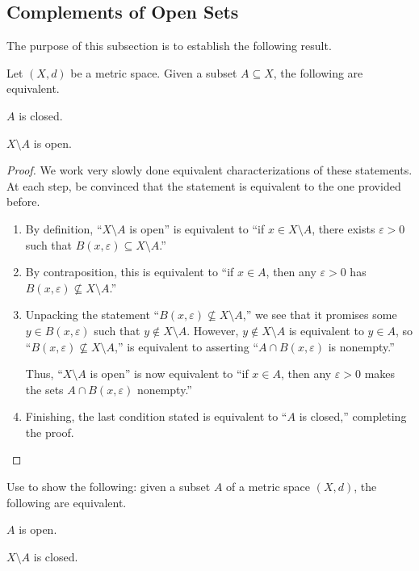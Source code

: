 \documentclass[../main.tex]{subfiles}
\begin{document}
\subsection{Complements of Open Sets}
The purpose of this subsection is to establish the following result.
\begin{theorem} \label{thm:complement-closed-is-open}
    Let $(X,d)$ be a metric space. Given a subset $A\subseteq X$, the following are equivalent.
    \begin{listalph}
        \item $A$ is closed.
        \item $X\setminus A$ is open.
    \end{listalph}
\end{theorem}
\begin{proof}
    We work very slowly done equivalent characterizations of these statements. At each step, be convinced that the statement is equivalent to the one provided before.
    \begin{enumerate}
        \item By definition, ``$X\setminus A$ is open'' is equivalent to ``if $x\in X\setminus A$, there exists $\varepsilon>0$ such that $B(x,\varepsilon)\subseteq X\setminus A$.''
        \item By contraposition, this is equivalent to ``if $x\in A$, then any $\varepsilon>0$ has $B(x,\varepsilon)\not\subseteq X\setminus A$.''
        \item Unpacking the statement ``$B(x,\varepsilon)\not\subseteq X\setminus A$,'' we see that it promises some $y\in B(x,\varepsilon)$ such that $y\notin X\setminus A$. However, $y\notin X\setminus A$ is equivalent to $y\in A$, so ``$B(x,\varepsilon)\not\subseteq X\setminus A$,'' is equivalent to asserting ``$A\cap B(x,\varepsilon)$ is nonempty.''

        Thus, ``$X\setminus A$ is open'' is now equivalent to ``if $x\in A$, then any $\varepsilon>0$ makes the sets $A\cap B(x,\varepsilon)$ nonempty.''
        \item Finishing, the last condition stated is equivalent to ``$A$ is closed,'' completing the proof.
        \qedhere
    \end{enumerate}
\end{proof}
\begin{exe}
    Use  to show the following: given a subset $A$ of a metric space $(X,d)$, the following are equivalent.
    \begin{listalph}
        \item $A$ is open.
        \item $X\setminus A$ is closed.
    \end{listalph}
\end{exe}
\end{document}
